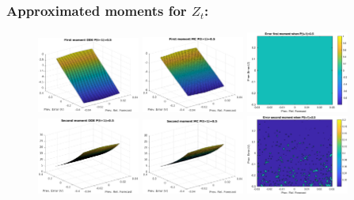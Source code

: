 \documentclass[aspectratio=169]{beamer}\usepackage[utf8]{inputenc}
\begin{document}
\begin{frame}\frametitle{Approximated moments for $Z_t$:}

\begin{figure}[ht!]
\centering
\includegraphics[width=0.3\textwidth]{../../MATLAB_Files/Results/moments/lamperti/errors/fm_ODE_4.eps}\quad
\includegraphics[width=0.3\textwidth]{../../MATLAB_Files/Results/moments/lamperti/errors/fm_MC_4.eps}\quad
\includegraphics[width=0.3\textwidth]{../../MATLAB_Files/Results/moments/lamperti/errors/fm_4.eps}\quad
\includegraphics[width=0.3\textwidth]{../../MATLAB_Files/Results/moments/lamperti/errors/sm_ODE_4.eps}\quad
\includegraphics[width=0.3\textwidth]{../../MATLAB_Files/Results/moments/lamperti/errors/sm_MC_4.eps}\quad
\includegraphics[width=0.3\textwidth]{../../MATLAB_Files/Results/moments/lamperti/errors/sm_4.eps}
\end{figure}

\end{frame}
\end{document}
